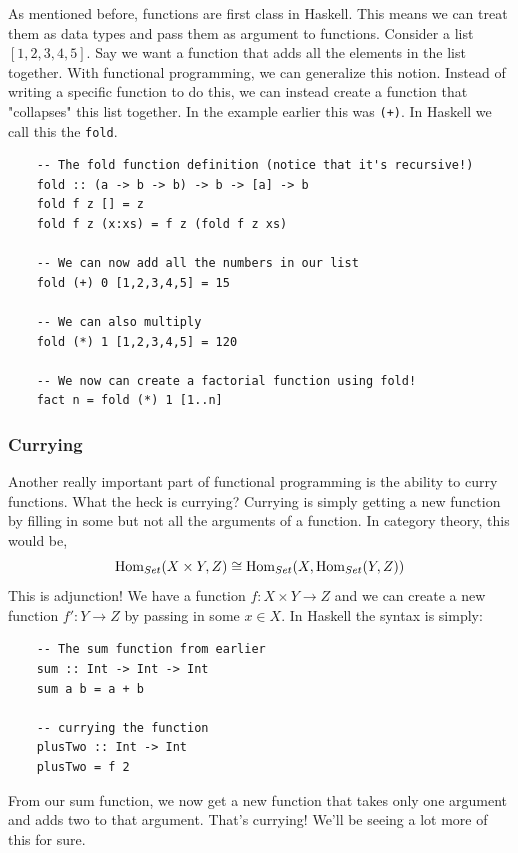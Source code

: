 As mentioned before, functions are first class in Haskell. 
This means we can treat them as data types and pass them as argument to functions. Consider a list $[1,2,3,4,5]$. 
Say we want a function that adds all the elements in the list together. With functional programming, we can generalize this notion. 
Instead of writing a specific function to do this, we can instead create a function that "collapses" this list together. In the example earlier this was \lstinline{(+)}. In Haskell we call this the \lstinline{fold}.

\begin{lstlisting}
    -- The fold function definition (notice that it's recursive!)
    fold :: (a -> b -> b) -> b -> [a] -> b
    fold f z [] = z
    fold f z (x:xs) = f z (fold f z xs)
    
    -- We can now add all the numbers in our list
    fold (+) 0 [1,2,3,4,5] = 15
    
    -- We can also multiply
    fold (*) 1 [1,2,3,4,5] = 120
    
    -- We now can create a factorial function using fold!
    fact n = fold (*) 1 [1..n]
\end{lstlisting}

\subsubsection{Currying}
Another really important part of functional programming is the ability to curry functions. What the heck is currying? Currying is simply getting a new function by filling in some but not all the arguments of a function. In category theory, this would be,
\[ \text{Hom}_{\normalfont{Set}}(X \times Y, Z) \cong \text{Hom}_{\normalfont{Set}}(X, \text{Hom}_{\normalfont{Set}}(Y, Z)) \]
This is adjunction! We have a function $f: X \times Y \rightarrow Z$ and we can create a new function $f' : Y \rightarrow Z$ by passing in some $x \in X$. In Haskell the syntax is simply:

\begin{lstlisting}
    -- The sum function from earlier
    sum :: Int -> Int -> Int
    sum a b = a + b
    
    -- currying the function
    plusTwo :: Int -> Int
    plusTwo = f 2
\end{lstlisting}

From our sum function, we now get a new function that takes only one argument and adds two to that argument. That's currying! We'll be seeing a lot more of this for sure.

